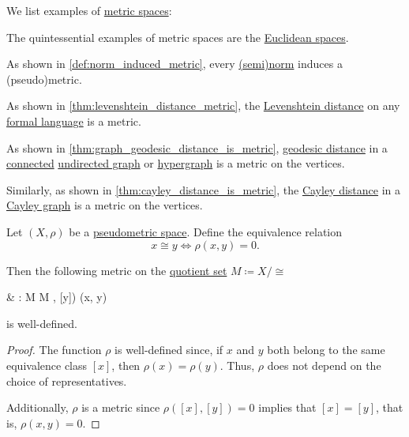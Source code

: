 \begin{example}\label{ex:def:metric_space}
  We list examples of \hyperref[def:metric_space]{metric spaces}:
  \begin{thmenum}
     The quintessential examples of metric spaces are the \hyperref[def:euclidean_space]{Euclidean spaces}.

     As shown in \cref{def:norm_induced_metric}, every \hyperref[def:norm]{(semi)norm} induces a (pseudo)metric.

     As shown in \cref{thm:levenshtein_distance_metric}, the \hyperref[def:levenshtein_distance]{Levenshtein distance} on any \hyperref[def:formal_language/language]{formal language} is a metric.

     As shown in \cref{thm:graph_geodesic_distance_is_metric}, \hyperref[def:graph_geodesic_distance]{geodesic distance} in a \hyperref[def:graph_connectedness/undirected]{connected} \hyperref[def:undirected_graph]{undirected graph} or \hyperref[def:hypergraph]{hypergraph} is a metric on the vertices.

    Similarly, as shown in \cref{thm:cayley_distance_is_metric}, the \hyperref[def:cayley_distance]{Cayley distance} in a \hyperref[def:cayley_graph]{Cayley graph} is a metric on the vertices.
  \end{thmenum}
\end{example}

\begin{proposition}\label{thm:pseudometric_to_metric}
  Let \( (X, \rho) \) be a \hyperref[def:metric_space]{pseudometric space}. Define the equivalence relation
  \begin{equation*}
    x \cong y \iff \rho(x, y) = 0.
  \end{equation*}

  Then the following metric on the \hyperref[thm:equivalence_partition]{quotient set} \( M \coloneqq X / \cong \)
  \begin{balign*}
     & \rho: M \times M \to [0, \infty)    \\
     & \rho([x], [y]) \coloneqq \rho(x, y)
  \end{balign*}
  is well-defined.
\end{proposition}
\begin{proof}
  The function \( \rho \) is well-defined since, if \( x \) and \( y \) both belong to the same equivalence class \( [x] \), then \( \rho(x) = \rho(y) \). Thus, \( \rho \) does not depend on the choice of representatives.

  Additionally, \( \rho \) is a metric since \( \rho([x], [y]) = 0 \) implies that \( [x] = [y] \), that is, \( \rho(x, y) = 0 \).
\end{proof}

